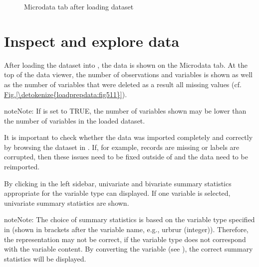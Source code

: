 \documentclass[letterpaper,10pt,english]{sphinxmanual}
\begin{document}
\begin{figure}[htbp]
\centering
\capstart

\noindent{}
\caption{Microdata tab after loading dataset}\label{\detokenize{loadprepdata:fig511}}\label{\detokenize{loadprepdata:id6}}\end{figure}


\section{Inspect and explore data}
\label{\detokenize{loadprepdata:inspect-and-explore-data}}
After loading the dataset into , the data is shown on the Microdata tab. At the top of
the data viewer, the number of observations and variables is shown as well as the number
of variables that were deleted as a result all missing values (cf. \hyperref[\detokenize{loadprepdata:fig511}]{Fig.\@ \ref{\detokenize{loadprepdata:fig511}}}).

\begin{sphinxadmonition}{note}{Note:}
If  is set to TRUE, the number of variables
shown may be lower than the number of variables in the loaded dataset.
\end{sphinxadmonition}

It is important to check whether the data was imported completely and correctly by browsing
the dataset in . If, for example, records are missing or labels are corrupted,
then these issues need to be fixed outside of  and the data need to be reimported.

By clicking  in the left sidebar, univariate and bivariate summary
statistics appropriate for the variable type can displayed. If one variable is selected,
univariate summary statistics are shown.

\begin{sphinxadmonition}{note}{Note:}
The choice of summary statistics is based on the variable type specified in  (shown in
brackets after the variable name, e.g., urbrur (integer)). Therefore,
the representation may not be correct, if the variable type does not correspond
with the variable content. By converting the variable (see {\hyperref[\detokenize{loadprepdata:convert-variable-type}]{}}),
the correct summary statistics will be displayed.
\end{sphinxadmonition}
\end{document}
